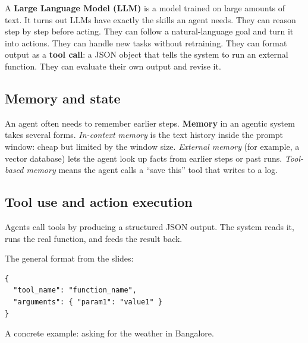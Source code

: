 \documentclass[a4paper,11pt]{article}
\newcommand{\vocab}[1]{\textbf{\color{navy}#1}}
\begin{document}
A \vocab{Large Language Model (LLM)} is a model trained on large amounts of text.
It turns out LLMs have exactly the skills an agent needs.
They can reason step by step before acting.
They can follow a natural-language goal and turn it into actions.
They can handle new tasks without retraining.
They can format output as a \vocab{tool call}: a JSON object that tells the system to run an external function.
They can evaluate their own output and revise it.

\subsection{Memory and state}

An agent often needs to remember earlier steps.
\vocab{Memory} in an agentic system takes several forms.
\emph{In-context memory} is the text history inside the prompt window: cheap but limited by the window size.
\emph{External memory} (for example, a vector database) lets the agent look up facts from earlier steps or past runs.
\emph{Tool-based memory} means the agent calls a ``save this'' tool that writes to a log.

\subsection{Tool use and action execution}

Agents call tools by producing a structured JSON output.
The system reads it, runs the real function, and feeds the result back.

The general format from the slides:

\begin{verbatim}
{
  "tool_name": "function_name",
  "arguments": { "param1": "value1" }
}
\end{verbatim}

A concrete example: asking for the weather in Bangalore.

\begin{center}
\small
{}
\end{center}
\end{document}
